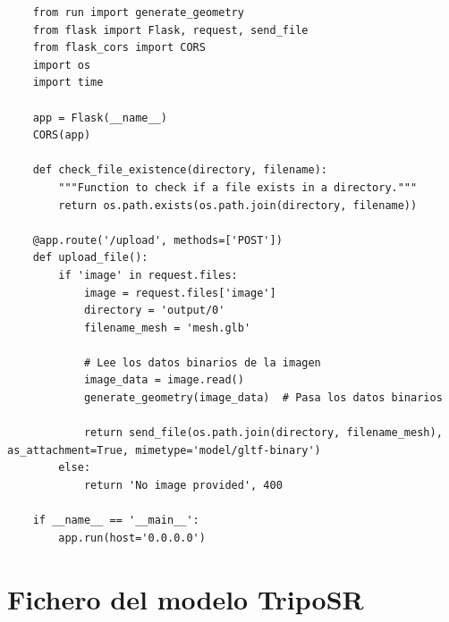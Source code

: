 \captionsetup{type=listing}
\label{lst:appAPI3d}
\begin{verbatim}
    from run import generate_geometry
    from flask import Flask, request, send_file
    from flask_cors import CORS
    import os
    import time
    
    app = Flask(__name__)
    CORS(app)
    
    def check_file_existence(directory, filename):
        """Function to check if a file exists in a directory."""
        return os.path.exists(os.path.join(directory, filename))
    
    @app.route('/upload', methods=['POST'])
    def upload_file():
        if 'image' in request.files:
            image = request.files['image']
            directory = 'output/0'
            filename_mesh = 'mesh.glb'
    
            # Lee los datos binarios de la imagen
            image_data = image.read()
            generate_geometry(image_data)  # Pasa los datos binarios
            
            return send_file(os.path.join(directory, filename_mesh), as_attachment=True, mimetype='model/gltf-binary')
        else:
            return 'No image provided', 400
    
    if __name__ == '__main__':
        app.run(host='0.0.0.0')
\end{verbatim}



\section{Fichero del modelo TripoSR}
\label{sec:puntoA5}
 
